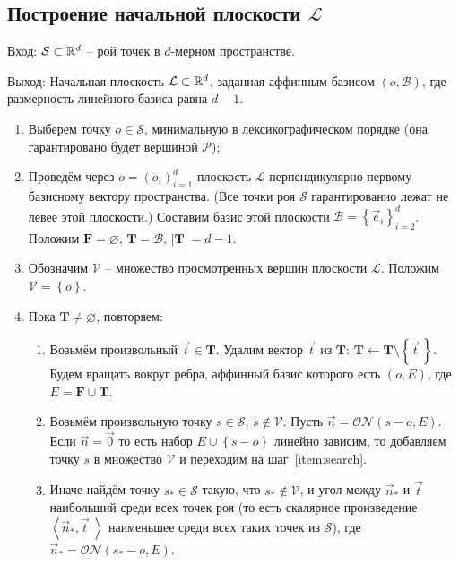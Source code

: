 \documentclass[a4paper,12pt]{article}
\newcommand{\R}[1][]{%
  \ifthenelse{\equal{#1}{}}%
  {\mathbb{R}}%
  {\mathbb{R}^{#1}}}
\newcommand{\Swarm}{\mathcal{S}}              %
\newcommand{\Polyhedron}{\mathcal{P}}         %
\newcommand{\Basis}{\mathcal{B}}              %
\newcommand{\Viewed}{\mathcal{V}}             %
\newcommand{\ZVec}{\vec 0}                    %
\newcommand{\set}[1]{\left\{ #1 \right\}}                    %
\newcommand{\scalprod}[2]{\left\langle #1, #2 \right\rangle} %
\newcommand{\ONorm}[3][]{\mathcal{ON}#1( #2, #3 #1)} %
\newcommand{\TempVec}{\mathbf{T}}  %
\newcommand{\FinalVec}{\mathbf{F}} %
\newcommand{\Plane}{\mathcal{L}}           %
\renewcommand{\.}{\hspace{0.2ex}}
\begin{document}
  \subsection{Построение начальной плоскости $\Plane$}
  \label{subsec:InitialPlane}

    Вход: $\Swarm \subset \R[d]$ -- рой точек в $d$-мерном пространстве.

    Выход: Начальная плоскость $\Plane \subset \R[d]$, заданная аффинным базисом $(o,\Basis)$, где размерность линейного базиса равна $d-1$.

    \begin{enumerate}
      \item Выберем точку $o \in \Swarm$, минимальную в лексикографическом порядке (она гарантировано будет вершиной $\Polyhedron$);

      \item Проведём через $o=(o_i)_{i = 1}^{d}$ плоскость $\Plane$ перпендикулярно первому базисному вектору пространства. (Все точки роя $\Swarm$ гарантированно лежат не левее этой плоскости.) Составим базис этой плоскости $\Basis = \set{\vec e_i}_{i=2}^d$. Положим $\FinalVec = \varnothing$, $\TempVec = \Basis$, $|\TempVec| = d-1$.

      \item Обозначим $\Viewed$ -- множество просмотренных вершин плоскости $\Plane$. Положим $\Viewed =\set{o}$.

      \item Пока $\TempVec \neq \varnothing$, повторяем:

      \begin{enumerate}
        \item Возьмём произвольный $\vec t \in \TempVec$. Удалим вектор $\vec t$ из $\TempVec$: $\TempVec \leftarrow \TempVec \setminus \set{\vec t \,}$. Будем вращать вокруг ребра, аффинный базис которого есть $(o, E)$, где $E = \FinalVec \cup \TempVec$.

        \item Возьмём произвольную точку $s \in \Swarm$, $s \notin \Viewed$. Пусть $\vec n = \ONorm{s - o}{E}$. Если $\vec n = \ZVec$ то есть набор $E \cup \set{s - o}$ линейно зависим, то добавляем точку $s$ в множество $\Viewed$ и переходим на шаг~\ref{item:search}.
        \label{item:search}

        \item Иначе найдём точку $s_* \in \Swarm$ такую, что $s_* \notin \Viewed$, и угол между $\vec n_*$ и $\vec t$ наибольший среди всех точек роя (то есть скалярное произведение $\scalprod{\vec n_*}{\vec t \;}$ наименьшее среди всех таких точек из $\Swarm$), где $\vec n_* = \ONorm{s_* - o}{E}$.


\end{enumerate}
\end{enumerate}
\end{document}
